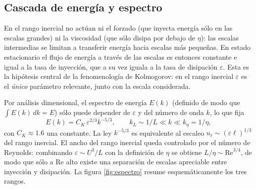 \documentclass[11pt]{article}
\begin{document}
\subsection{Cascada de energía y espectro}

En el rango inercial no actúan ni el forzado (que inyecta energía sólo en
las escalas grandes) ni la viscosidad (que sólo disipa por debajo de
$\eta$): las escalas intermedias se limitan a transferir energía hacia
escalas más pequeñas. En estado estacionario el flujo de energía a través
de las escalas es entonces constante e igual a la tasa de inyección, que
a su vez iguala a la tasa de disipación $\varepsilon$. Esta es la
hipótesis central de la fenomenología de Kolmogorov: en el rango inercial
$\varepsilon$ es el \emph{único} parámetro relevante, junto con la escala
considerada.

Por análisis dimensional, el espectro de energía $E(k)$ (definido de modo
que $\int E(k)\,dk = E$) sólo puede depender de $\varepsilon$ y del número
de onda $k$, lo que fija
\begin{equation}
  E(k) = C_K\,\varepsilon^{2/3} k^{-5/3},
  \qquad k_L \sim 1/L \ll k \ll k_\eta = 1/\eta,
  \label{eq:k41}
\end{equation}
con $C_K \approx 1.6$ una constante. La ley $k^{-5/3}$ es equivalente al escaleo
$u_\ell \sim (\varepsilon\ell)^{1/3}$ del rango inercial. El ancho del rango
inercial
queda controlado por el número de Reynolds: combinando $\varepsilon \sim
U^3/L$ con la definición de $\eta$ se obtiene $L/\eta \sim
\mathrm{Re}^{3/4}$, de modo que sólo a $\mathrm{Re}$ alto existe una
separación de escalas apreciable entre inyección y disipación. La figura
\ref{fig:espectro} resume esquemáticamente los tres rangos.
\end{document}
